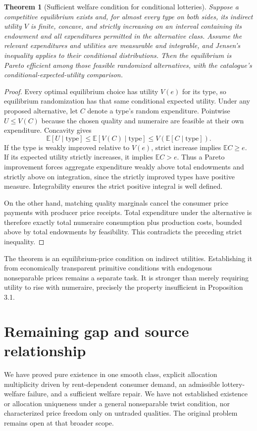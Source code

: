 \documentclass[11pt,a4paper]{article}
\newtheorem{theorem}{Theorem}[section]
\theoremstyle{remark}
\newcommand{\E}{\mathbb E}
\begin{document}
\begin{theorem}[Sufficient welfare condition for conditional lotteries]
Suppose a competitive equilibrium exists and, for almost every type on both sides, its indirect utility $V$ is finite, concave, and strictly increasing on an interval containing its endowment and all expenditures permitted in the alternative class. Assume the relevant expenditures and utilities are measurable and integrable, and Jensen's inequality applies to their conditional distributions. Then the equilibrium is Pareto efficient among those feasible randomized alternatives, with the catalogue's conditional-expected-utility comparison.
\end{theorem}
\begin{proof}
Every optimal equilibrium choice has utility $V(e)$ for its type, so equilibrium randomization has that same conditional expected utility. Under any proposed alternative, let $C$ denote a type's random expenditure. Pointwise $U\le V(C)$ because the chosen quality and numeraire are feasible at their own expenditure. Concavity gives
\[
 \E[U\mid\text{type}]\le\E[V(C)\mid\text{type}]
 \le V(\E[C\mid\text{type}]).
\]
If the type is weakly improved relative to $V(e)$, strict increase implies $\E C\ge e$. If its expected utility strictly increases, it implies $\E C>e$. Thus a Pareto improvement forces aggregate expenditure weakly above total endowments and strictly above on integration, since the strictly improved types have positive measure. Integrability ensures the strict positive integral is well defined.

On the other hand, matching quality marginals cancel the consumer price payments with producer price receipts. Total expenditure under the alternative is therefore exactly total numeraire consumption plus production costs, bounded above by total endowments by feasibility. This contradicts the preceding strict inequality.
\end{proof}

The theorem is an equilibrium-price condition on indirect utilities. Establishing it from economically transparent primitive conditions with endogenous nonseparable prices remains a separate task. It is stronger than merely requiring utility to rise with numeraire, precisely the property insufficient in Proposition 3.1.

\section{Remaining gap and source relationship}
We have proved pure existence in one smooth class, explicit allocation multiplicity driven by rent-dependent consumer demand, an admissible lottery-welfare failure, and a sufficient welfare repair. We have not established existence or allocation uniqueness under a general nonseparable twist condition, nor characterized price freedom only on untraded qualities. The original problem remains open at that broader scope.
\end{document}
